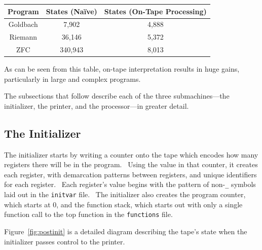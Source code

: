 \documentclass[11pt]{article}
\newcommand{\statenum}{8,013 }
\newcommand{\gbstatenum}{4,888 }
\newcommand{\rmstatenum}{5,372 }
\begin{document}
\begin{center}
    \begin{tabular}{||c c c||}
    \hline
    Program & States (Na\"ive) & States (On-Tape Processing) \\ [0.5ex]
    \hline
    Goldbach & 7,902 & \gbstatenum\\
    \hline
    Riemann & 36,146 & \rmstatenum\\
    \hline
    ZFC & 340,943 & \statenum\\
    \hline
    \end{tabular}
\end{center}

As can be seen from this table, on-tape interpretation results in huge gains, particularly in large and complex programs.

The subsections that follow describe each of the three submachines---the initializer, the printer, and the processor---in greater detail.

\subsection{The Initializer}

The initializer starts by writing a counter onto the tape which encodes how many registers there will be in the program. \ Using the value in that counter, it creates each register, with demarcation patterns between registers, and unique identifiers for each register. \ Each register's value begins with the pattern of non-\texttt{\_} symbols laid out in the \texttt{initvar} file. \ The initializer also creates the program counter, which starts at 0, and the function stack, which starts out with only a single function call to the top function in the \texttt{functions} file.

Figure~\ref{fig:postinit} is a detailed diagram describing the tape's state when the initializer passes control to the printer.
\end{document}

